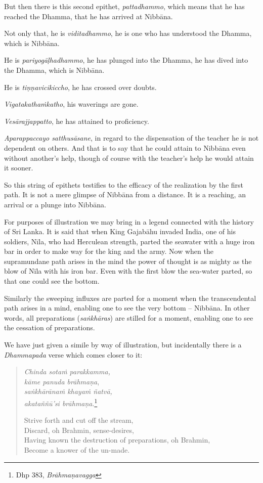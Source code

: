 But then there is this second epithet, \emph{pattadhammo}, which means that he has reached the Dhamma, that he has arrived at Nibbāna.

Not only that, he is \emph{viditadhammo}, he is one who has understood the Dhamma, which is Nibbāna.

He is \emph{pariyogāḷhadhammo}, he has plunged into the Dhamma, he has dived into the Dhamma, which is Nibbāna.

He is \emph{tiṇṇavicikiccho}, he has crossed over doubts.

\emph{Vigatakathaṁkatho}, his waverings are gone.

\emph{Vesārajjappatto}, he has attained to proficiency.

\emph{Aparappaccayo satthusāsane}, in regard to the dispensation of the teacher he is not dependent on others. And that is to say that he could attain to Nibbāna even without another's help, though of course with the teacher's help he would attain it sooner.

So this string of epithets testifies to the efficacy of the realization by the first path. It is not a mere glimpse of Nibbāna from a distance. It is a reaching, an arrival or a plunge into Nibbāna.

For purposes of illustration we may bring in a legend connected with the history of Sri Lanka. It is said that when King Gajabāhu invaded India, one of his soldiers, Nīla, who had Herculean strength, parted the seawater with a huge iron bar in order to make way for the king and the army. Now when the supramundane path arises in the mind the power of thought is as mighty as the blow of Nīla with his iron bar. Even with the first blow the sea-water parted, so that one could see the bottom.

Similarly the sweeping influxes are parted for a moment when the transcendental path arises in a mind, enabling one to see the very bottom -- Nibbāna. In other words, all preparations (\emph{saṅkhāras}) are stilled for a moment, enabling one to see the cessation of preparations.

We have just given a simile by way of illustration, but incidentally there is a \emph{Dhammapada} verse which comes closer to it:

\begin{quote}
\emph{Chinda sotaṁ parakkamma,}\\
\emph{kāme panuda brāhmaṇa},\\
\emph{saṅkhārānaṁ khayaṁ ñatvā,}\\
\emph{akataññū'si brāhmaṇa}.\footnote{Dhp 383, \emph{Brāhmaṇavagga}}

Strive forth and cut off the stream,\\
Discard, oh Brahmin, sense-desires,\\
Having known the destruction of preparations, oh Brahmin,\\
Become a knower of the un-made.
\end{quote}

